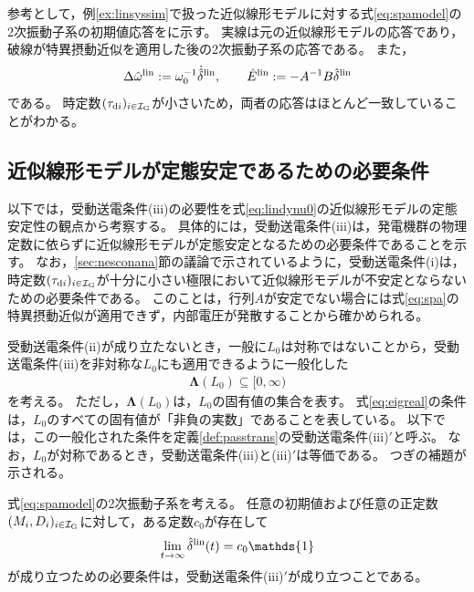 \documentclass[tombow,dvipdfmx]{corona-a5-1.1}
\begin{document}
\begin{例}[近似線形モデルに対する特異摂動近似]
参考として，例\ref{ex:linsyssim}で扱った近似線形モデルに対する式\ref{eq:spamodel}の2次振動子系の初期値応答をに示す。
実線は元の近似線形モデルの応答であり，破線が特異摂動近似を適用した後の2次振動子系の応答である。
また，
\[\Delta \hat{\omega}^{\rm lin}:=\omega_0^{-1} \dot{\hat{\delta}}^{\rm lin},\qquad
\hat{E}^{\rm lin}:=-A^{-1}B\hat{\delta}^{\rm lin}
\]
である。
時定数$(\tau_{{\rm d}i})_{i \in \mathcal{I}_{\rm G}}$が小さいため，両者の応答はほとんど一致していることがわかる。
\end{例}

\subsection{近似線形モデルが定態安定であるための必要条件\advanced}\label{sec:nesconsta}

以下では，受動送電条件(iii)の必要性を式\ref{eq:lindynu0}の近似線形モデルの定態安定性の観点から考察する。
具体的には，受動送電条件(iii)は，発電機群の物理定数に依らずに近似線形モデルが定態安定となるための必要条件であることを示す。
なお，\ref{sec:nesconana}節の議論で示されているように，受動送電条件(i)は，時定数$(\tau_{{\rm d}i})_{i \in \mathcal{I}_{\rm G}}$が十分に小さい極限において近似線形モデルが不安定とならないための必要条件である。
このことは，行列$A$が安定でない場合には式\ref{eq:spa}の特異摂動近似が適用できず，内部電圧が発散することから確かめられる。



受動送電条件(ii)が成り立たないとき，一般に$L_0$は対称ではないことから，受動送電条件(iii)を非対称な$L_0$にも適用できるように一般化した
\begin{align}\label{eq:eigreal}
\bm{\Lambda}(L_0)\subseteq [0,\infty)
\end{align}
を考える。
ただし，$\bm{\Lambda}(L_0)$は，$L_0$の固有値の集合を表す。
式\ref{eq:eigreal}の条件は，$L_0$のすべての固有値が「非負の実数」であることを表している。
以下では，この一般化された条件を定義\ref{def:passtrans}の受動送電条件(iii)$'$と呼ぶ。
なお，$L_0$が対称であるとき，受動送電条件(iii)と(iii)$'$は等価である。
つぎの補題が示される。

\begin{補題}[2次振動子系の定態安定性の必要条件]\label{thm:2ndsys}
式\ref{eq:spamodel}の2次振動子系を考える。
任意の初期値および任意の正定数$(M_i,D_i)_{i \in \mathcal{I}_{\rm G}}$に対して，ある定数$c_0$が存在して
\begin{align}\label{eq:delhat0}
\lim_{t\rightarrow \infty} \hat{\delta}^{\rm lin}(t)= c_0 \mathds{1}
\end{align}
が成り立つための必要条件は，受動送電条件(iii)$'$が成り立つことである。
\end{補題}
\end{document}
